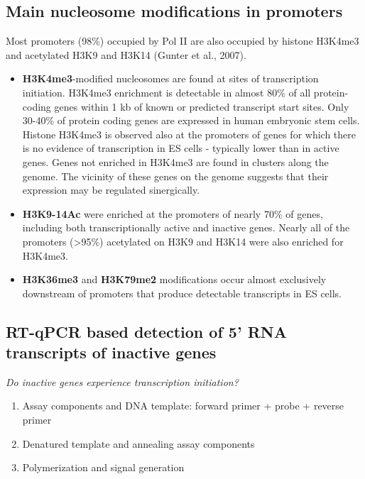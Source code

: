 \hypertarget{main-nucleosome-modifications-in-promoters}{%
\subsection{Main nucleosome modifications in promoters}\label{main-nucleosome-modifications-in-promoters}}

Most promoters (98\%) occupied by Pol II are also occupied by histone H3K4me3 and acetylated H3K9 and H3K14 (Gunter et al., 2007).

\begin{itemize}
\tightlist
\item
  \textbf{H3K4me3}-modified nucleosomes are found at sites of transcription initiation. H3K4me3 enrichment is detectable in almost 80\% of all protein-coding genes within 1 kb of known or predicted transcript start sites. Only 30-40\% of protein coding genes are expressed in human embryonic stem cells. Histone H3K4me3 is observed also at the promoters of genes for which there is no evidence of transcription in ES cells - typically lower than in active genes. Genes not enriched in H3K4me3 are found in clusters along the genome. The vicinity of these genes on the genome suggests that their expression may be regulated sinergically.
\item
  \textbf{H3K9-14Ac} were enriched at the promoters of nearly 70\% of genes, including both transcriptionally active and inactive genes. Nearly all of the promoters (\textgreater95\%) acetylated on H3K9 and H3K14 were also enriched for H3K4me3.
\item
  \textbf{H3K36me3} and \textbf{H3K79me2} modifications occur almost exclusively downstream of promoters that produce detectable transcripts in ES cells.
\end{itemize}

\hypertarget{rt-qpcr-based-detection-of-5-rna-transcripts-of-inactive-genes}{%
\subsection{RT-qPCR based detection of 5' RNA transcripts of inactive genes}\label{rt-qpcr-based-detection-of-5-rna-transcripts-of-inactive-genes}}
\emph{Do inactive genes experience transcription initiation?}
\begin{enumerate}
\def\labelenumi{\arabic{enumi}.}
\tightlist
\item
  Assay components and DNA template: forward primer + probe + reverse primer
\item
  Denatured template and annealing assay components
\item
  Polymerization and signal generation
\end{enumerate}

